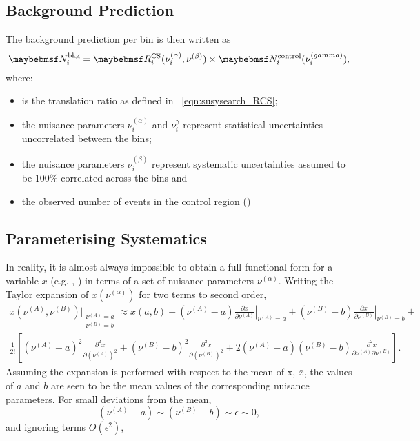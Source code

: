 \subsection{Background Prediction}
The background prediction per bin is then written as
\begin{equation*}
\NBkgi = \RCSi(\nu_i^{(\alpha)}, \nu^{(\beta)}) \times \NControli(\nu_i^{(\gamma)}),
\end{equation*}
where:
\begin{itemize}
\item \RCSi is the translation ratio as defined in \eqn~\ref{eqn:susysearch_RCS};
\item the nuisance parameters $\nu_i^{(\alpha)}$ and $\nu_i^{\gamma}$ represent
  statistical uncertainties uncorrelated between the bins;
\item the nuisance parameters $\nu_i^{(\beta)}$ represent systematic
  uncertainties assumed to be 100\% correlated across the bins and
\item \NControli the observed number of events in the control region
(\LPcontrol)
\end{itemize}

\subsection{Parameterising Systematics}
In reality, it is almost always impossible to obtain a full functional form for
a variable $x$ (e.g. \RCSi, \NControli) in terms of a set of nuisance parameters
$\nu^{(\alpha)}$. Writing the Taylor expansion of $x(\nu^{(\alpha)})$ for two terms to
second order,
\begin{align*}
 x(\nu^{(A)}, \nu^{(B)})\bigg|_{\substack{\nu^{(A)} = a\\ \nu^{(B)} = b}} \approx
x(a,b) +
(\nu^{(A)} - a)\left.\frac{\partial x}{\partial\nu^{(A)}}\right|_{\nu^{(A)}=a} +
(\nu^{(B)} - b)\left.\frac{\partial x}{\partial\nu^{(B)}}\right|_{\nu^{(B)}=b} +\\
\frac{1}{2!}\left[
(\nu^{(A)} - a)^2 \frac{\partial^2 x}{\partial \left(\nu^{(A)}\right)^2}
+ (\nu^{(B)} - b)^2 \frac{\partial^2 x}{\partial \left(\nu^{(B)}\right)^2}
+ 2(\nu^{(A)} - a)(\nu^{(B)} - b)\frac{\partial^2 x}{\partial
  \nu^{(A)}\partial\nu^{(B)}}
\right].
\end{align*}
Assuming the expansion is performed with respect to the mean of x, $\bar{x}$,
the values of $a$ and $b$ are seen to be the mean values of the corresponding nuisance
parameters. For small deviations from the mean,
\begin{equation*}
 (\nu^{(A)} - a) \sim (\nu^{(B)} - b) \sim \epsilon \sim 0,
\end{equation*}
and ignoring terms $O(\epsilon^2)$,

